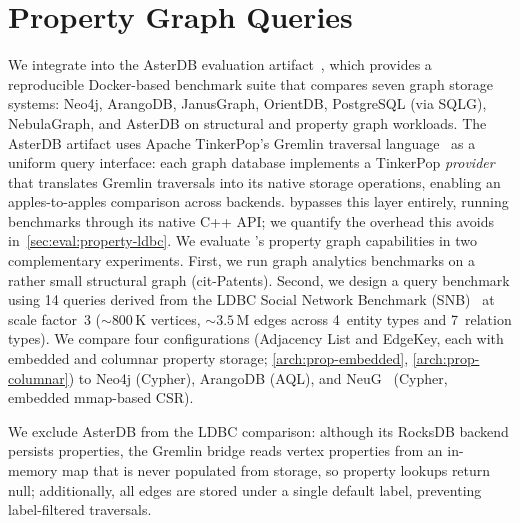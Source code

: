 \section{Property Graph Queries}
\label{sec:eval:property}

We integrate \project{} into the AsterDB evaluation artifact~\cite{moAsterEnhancingLSMstructures2025}, which provides a reproducible Docker-based benchmark suite that compares seven graph storage systems: Neo4j, ArangoDB, JanusGraph, OrientDB, PostgreSQL (via SQLG), NebulaGraph, and AsterDB on structural and property graph workloads.
The AsterDB artifact uses Apache TinkerPop's Gremlin traversal language~\cite{apachetinkerpop} as a uniform query interface: each graph database implements a TinkerPop \emph{provider} that translates Gremlin traversals into its native storage operations, enabling an apples-to-apples comparison across backends.
\project{} bypasses this layer entirely, running benchmarks through its native C++ API; we quantify the overhead this avoids in~\autoref{sec:eval:property-ldbc}.
We evaluate \project{}'s property graph capabilities in two complementary experiments.
First, we run graph analytics benchmarks on a rather small structural graph (cit-Patents).
Second, we design a query benchmark using 14 queries derived from the LDBC Social Network Benchmark (SNB)~\cite{erling2015ldbc} at scale factor~3 (${\sim}800$\,K vertices, ${\sim}3.5$\,M edges across 4~entity types and 7~relation types).
We compare four \project{} configurations (Adjacency List and EdgeKey, each with embedded and columnar property storage; \autoref{arch:prop-embedded}, \autoref{arch:prop-columnar}) to Neo4j (Cypher), ArangoDB (AQL), and NeuG~\cite{NeuG2025Alibaba} (Cypher, embedded mmap-based CSR).

We exclude AsterDB from the LDBC comparison: although its RocksDB backend persists properties, the Gremlin bridge reads vertex properties from an in-memory map that is never populated from storage, so property lookups return null; additionally, all edges are stored under a single default label, preventing label-filtered traversals.


